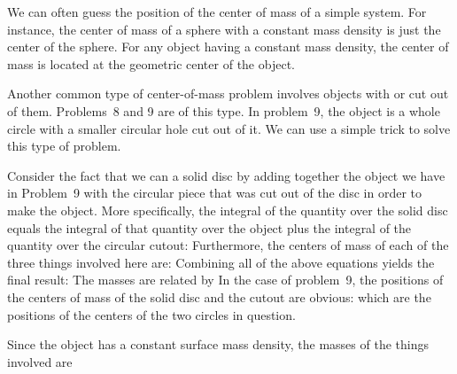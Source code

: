 {{
We can often guess the position of the center of mass of a simple system.
For instance, the center of mass of a sphere with a constant mass density is
just the center of the sphere.
For any object having a constant mass density, the center of mass is located
at the geometric center of the object.

Another common type of center-of-mass problem involves objects with 
or  cut out of them.
Problems~8 and 9 are of this type.
In problem~9, the object is a whole circle with a smaller circular hole cut
out of it.
We can use a simple trick to solve this type of problem.

Consider the fact that we can  a solid disc by adding together
the object we have in Problem~9 with the circular piece that was cut out of
the disc in order to make the object.
More specifically, the integral of the quantity  over
the solid disc equals the integral of that quantity over the object plus the
integral of the quantity over the circular cutout:
%
%
Furthermore, the centers of mass of each of the three things involved here are:
%
%
%
%
Combining all of the above equations yields the final result:
%
%
The masses are related by
%
%
In the case of problem~9, the positions of the centers of mass of the solid
disc and the cutout are obvious:
%
%
%
which are the positions of the centers of the two circles in question.

Since the object has a constant surface mass density, the masses of the
things involved are
%
%
%

}}
